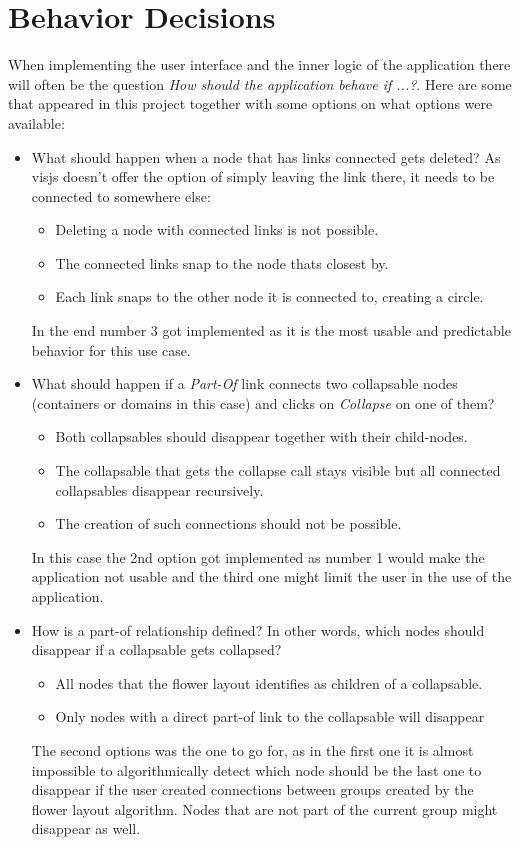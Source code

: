 \section{Behavior Decisions}
When implementing the user interface and the inner logic of the application there will often be the question \emph{How should the application behave if ...?}. Here are some that appeared in this project together with some options on what options were available:
\begin{itemize}
\item What should happen when a node that has links connected gets deleted? As visjs doesn't offer the option of simply leaving the link there, it needs to be connected to somewhere else:
\begin{itemize}
\item Deleting a node with connected links is not possible.
\item The connected links snap to the node thats closest by.
\item Each link snaps to the other node it is connected to, creating a circle.
\end{itemize}
In the end number 3 got implemented as it is the most usable and predictable behavior for this use case.

\item What should happen if a \emph{Part-Of} link connects two collapsable nodes (containers or domains in this case) and clicks on \emph{Collapse} on one of them?
\begin{itemize}
\item Both collapsables should disappear together with their child-nodes.
\item The collapsable that gets the collapse call stays visible but all connected collapsables disappear recursively.
\item The creation of such connections should not be possible.
\end{itemize}
In this case the 2nd option got implemented as number 1 would make the application not usable and the third one might limit the user in the use of the application.

\item How is a part-of relationship defined? In other words, which nodes should disappear if a collapsable gets collapsed?
\begin{itemize}
\item All nodes that the flower layout identifies as children of a collapsable.
\item Only nodes with a direct part-of link to the collapsable will disappear
\end{itemize}
The second options was the one to go for, as in the first one it is almost impossible to algorithmically detect which node should be the last one to disappear if the user created connections between groups created by the flower layout algorithm. Nodes that are not part of the current group might disappear as well.

\end{itemize}


